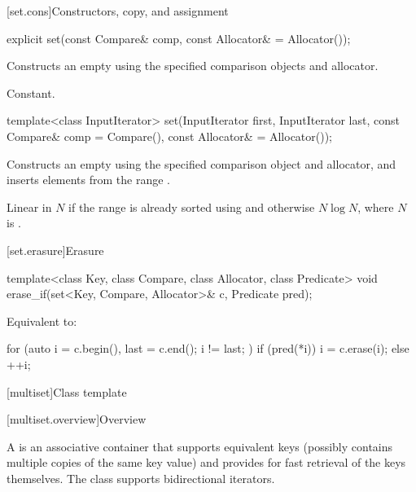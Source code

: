 [set.cons]{Constructors, copy, and assignment}

%
\begin{itemdecl}
explicit set(const Compare& comp, const Allocator& = Allocator());
\end{itemdecl}

\begin{itemdescr}
\pnum
\effects
Constructs an empty  using the specified comparison objects and allocator.

\pnum
\complexity
Constant.
\end{itemdescr}

%
\begin{itemdecl}
template<class InputIterator>
  set(InputIterator first, InputIterator last,
      const Compare& comp = Compare(), const Allocator& = Allocator());
\end{itemdecl}

\begin{itemdescr}
\pnum
\effects
Constructs an empty
using the specified comparison object and allocator,
and inserts elements from the range
.

\pnum
\complexity
Linear in $N$ if the range
is already sorted using 
and otherwise $N \log N$,
where $N$ is
.
\end{itemdescr}

[set.erasure]{Erasure}

%
\begin{itemdecl}
template<class Key, class Compare, class Allocator, class Predicate>
  void erase_if(set<Key, Compare, Allocator>& c, Predicate pred);
\end{itemdecl}

\begin{itemdescr}
\pnum
\effects
Equivalent to:
\begin{codeblock}
for (auto i = c.begin(), last = c.end(); i != last; ) {
  if (pred(*i)) {
    i = c.erase(i);
  } else {
    ++i;
  }
}
\end{codeblock}
\end{itemdescr}

[multiset]{Class template }

[multiset.overview]{Overview}

\pnum
{}%
A
is an associative container that supports equivalent keys (possibly contains multiple copies of
the same key value) and provides for fast retrieval of the keys themselves.
The
 class
supports bidirectional iterators.

